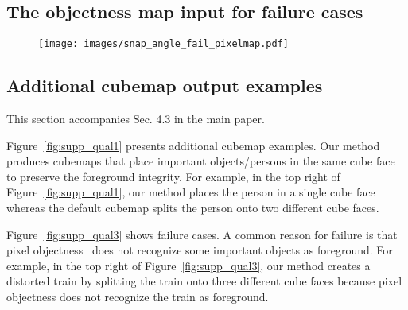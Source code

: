 \subsection{The objectness map input for failure cases}




\begin{figure}

\centering
\renewcommand{\tabcolsep}{0pt}
\texttt{[image: images/snap\_angle\_fail\_pixelmap.pdf]}%

\caption{}
\label{fig:fail}
\end{figure}

\clearpage








\subsection{Additional cubemap output examples}

This section accompanies Sec. 4.3 in the main paper.

Figure~\ref{fig:supp_qual1} presents additional cubemap examples.  
Our method produces cubemaps that place important objects/persons in the same cube face to preserve the foreground integrity. For example, in the top right of Figure~\ref{fig:supp_qual1}, our method places the person in a single cube face whereas the default cubemap splits the person onto two different cube faces.

Figure~\ref{fig:supp_qual3} shows failure cases.
A common reason for failure is that pixel objectness~\cite{jain2017pixel} does not recognize some important objects as foreground. For example, in the top right of Figure~\ref{fig:supp_qual3}, our method creates a distorted train by
splitting the train onto three different cube faces because pixel objectness does not recognize the train as foreground.



